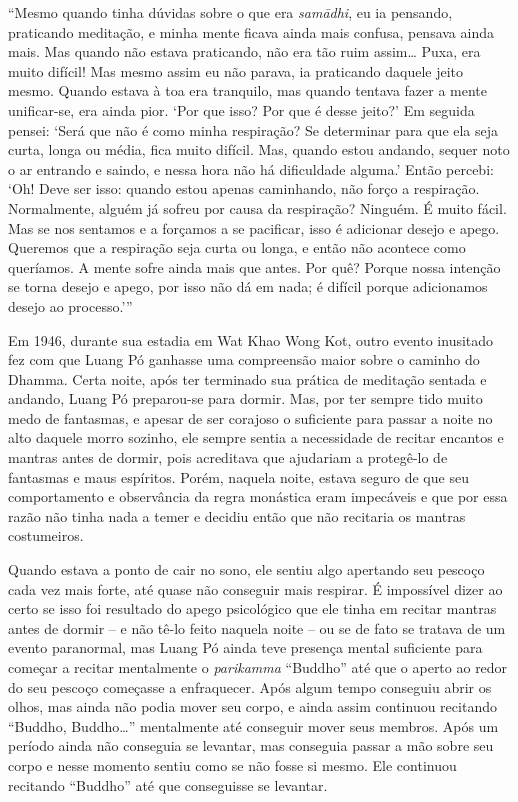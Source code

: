 ``Mesmo quando tinha dúvidas sobre o que era \emph{samādhi}, eu ia
pensando, praticando meditação, e minha mente ficava ainda mais confusa,
pensava ainda mais. Mas quando não estava praticando, não era tão ruim
assim\ldots{} Puxa, era muito difícil! Mas mesmo assim eu não parava, ia
praticando daquele jeito mesmo. Quando estava à toa era tranquilo, mas
quando tentava fazer a mente unificar-se, era ainda pior. `Por que isso?
Por que é desse jeito?' Em seguida pensei: `Será que não é como minha
respiração? Se determinar para que ela seja curta, longa ou média, fica
muito difícil. Mas, quando estou andando, sequer noto o ar entrando e
saindo, e nessa hora não há dificuldade alguma.' Então percebi: `Oh!
Deve ser isso: quando estou apenas caminhando, não forço a respiração.
Normalmente, alguém já sofreu por causa da respiração? Ninguém. É muito
fácil. Mas se nos sentamos e a forçamos a se pacificar, isso é adicionar
desejo e apego. Queremos que a respiração seja curta ou longa, e então
não acontece como queríamos. A mente sofre ainda mais que antes. Por
quê? Porque nossa intenção se torna desejo e apego, por isso não dá em
nada; é difícil porque adicionamos desejo ao processo.'''

Em 1946, durante sua estadia em Wat Khao Wong Kot, outro evento
inusitado fez com que Luang Pó ganhasse uma compreensão maior sobre o
caminho do Dhamma. Certa noite, após ter terminado sua prática de
meditação sentada e andando, Luang Pó preparou-se para dormir. Mas, por
ter sempre tido muito medo de fantasmas, e apesar de ser corajoso o
suficiente para passar a noite no alto daquele morro sozinho, ele sempre
sentia a necessidade de recitar encantos e mantras antes de dormir, pois
acreditava que ajudariam a protegê-lo de fantasmas e maus espíritos.
Porém, naquela noite, estava seguro de que seu comportamento e
observância da regra monástica eram impecáveis e que por essa razão não
tinha nada a temer e decidiu então que não recitaria os mantras
costumeiros.

Quando estava a ponto de cair no sono, ele sentiu algo apertando seu
pescoço cada vez mais forte, até quase não conseguir mais respirar. É
impossível dizer ao certo se isso foi resultado do apego psicológico que
ele tinha em recitar mantras antes de dormir -- e não tê-lo feito
naquela noite -- ou se de fato se tratava de um evento paranormal, mas
Luang Pó ainda teve presença mental suficiente para começar a recitar
mentalmente o \emph{parikamma} ``Buddho'' até que o aperto ao redor do
seu pescoço começasse a enfraquecer. Após algum tempo conseguiu abrir os
olhos, mas ainda não podia mover seu corpo, e ainda assim continuou
recitando ``Buddho, Buddho\ldots{}'' mentalmente até conseguir mover
seus membros. Após um período ainda não conseguia se levantar, mas
conseguia passar a mão sobre seu corpo e nesse momento sentiu como se
não fosse si mesmo. Ele continuou recitando ``Buddho'' até que
conseguisse se levantar.

